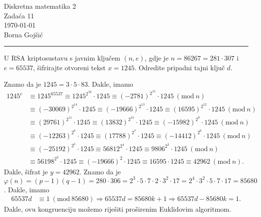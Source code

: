 \documentclass{exam}
\newcommand{\Mod}[1]{\ (\mathrm{mod}\ #1)}
\def \brojZadace {11}
\begin{document}
\begingroup
\centering
\LARGE Diskretna matematika 2\\
\Large Zadaća \brojZadace\\
\large \today\\
\large Borna Gojšić\par
\endgroup
\rule{\textwidth}{0.4pt}
\pointsdroppedatright   %
\printanswers
\renewcommand{\solutiontitle}{\noindent\textbf{Rj:}\enspace}   %

\begin{questions}

\question U RSA kriptosustavu s javnim ključem $(n, e)$, gdje je $n = 86267 = 281 \cdot 307$ i $e = 65537$, šifrirajte otvoreni tekst $x = 1245$. Odredite pripadni tajni ključ $d$.

\begin{solution}
  Znamo da je $1245 = 3 \cdot 5 \cdot 83$. Dakle, imamo
  \begin{align*}
    1245^e &\equiv 1245^{65537} \equiv 1245^{2^{16}} \cdot 1245 \equiv (-2781)^{2^{15}} \cdot 1245 \Mod{n}\\
    &\equiv (-30069)^{2^{14}} \cdot 1245 \equiv (-19666)^{2^{13}} \cdot 1245 \equiv (16595)^{2^{12}} \cdot 1245 \Mod{n}\\
    &\equiv (29761)^{2^{11}} \cdot 1245 \equiv (13832)^{2^{10}} \cdot 1245 \equiv (-15982)^{2^9} \cdot 1245 \Mod{n}\\
    &\equiv (-12263)^{2^8} \cdot 1245 \equiv (17788)^{2^7} \cdot 1245 \equiv (-14412)^{2^6} \cdot 1245 \Mod{n}\\
    &\equiv (-25192)^{2^5} \cdot 1245 \equiv 56812^{2^4} \cdot 1245 \equiv 9806^{2^3} \cdot 1245 \Mod{n}\\
    &\equiv 56198^{2^2} \cdot 1245 \equiv (-19666)^2 \cdot 1245 \equiv 16595 \cdot 1245 \equiv 42962 \Mod{n}.
  \end{align*}
  Dakle, šifrat je $y = 42962$.
  Znamo da je $\varphi(n) = (p - 1)(q - 1) = 280 \cdot 306 = 2^3 \cdot 5 \cdot 7 \cdot 2 \cdot 3^2 \cdot 17 = 2^4 \cdot 3^2 \cdot 5 \cdot 7 \cdot 17 = 85680$.
  Dakle, imamo
  \begin{align*}
    65537 d &\equiv 1 \Mod{85680} \Rightarrow 65537 d = 85680 k + 1 \Rightarrow 65537 d - 85680 k = 1.
  \end{align*}
  Dakle, ovu kongruenciju možemo riješiti proširenim Euklidovim algoritmom.


\end{solution}
\end{questions}
\end{document}
